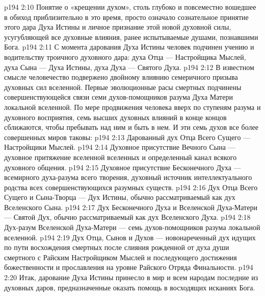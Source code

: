 \vs p194 2:10 \pc Понятие о «крещении духом», столь глубоко и повсеместно вошедшее в обиход приблизительно в это время, просто означало сознательное принятие этого дара Духа Истины и личное признание этой новой духовной силы, усугубляющей все духовные влияния, ранее испытываемые душами, познавшими Бога.
\vs p194 2:11 \pc С момента дарования Духа Истины человек подчинен учению и водительству троичного духовного дара: духа Отца --- Настройщика Мыслей, духа Сына --- Духа Истины, духа Духа --- Святого Духа.
\vs p194 2:12 В известном смысле человечество подвержено двойному влиянию семеричного призыва духовных сил вселенной. Первые эволюционные расы смертных подчинены совершенствующейся связи семи духов\hyp{}помощников разума Духа Матери локальной вселенной. По мере продвижения человека вверх по ступеням разума и духовного восприятия, семь высших духовных влияний в конце концов сближаются, чтобы пребывать над ним и быть в нем. И эти семь духов все более совершенных миров таковы:
\vs p194 2:13 \bibnobreakspace Дарованный дух Отца Всего Сущего --- Настройщики Мыслей.
\vs p194 2:14 \pc {}\bibnobreakspace Духовное присутствие Вечного Сына --- духовное притяжение вселенной вселенных и определенный канал всякого духовного общения.
\vs p194 2:15 \pc {}\bibnobreakspace Духовное присутствие Бесконечного Духа --- всемирного духа\hyp{}разума всего творения, духовный источник интеллектуального родства всех совершенствующихся разумных существ.
\vs p194 2:16 \pc {}\bibnobreakspace Дух Отца Всего Сущего и Сына\hyp{}Творца --- Дух Истины, обычно рассматриваемый как дух Вселенского Сына.
\vs p194 2:17 \pc {}\bibnobreakspace Дух Бесконечного Духа и Вселенской Духа\hyp{}Матери --- Святой Дух, обычно рассматриваемый как дух Вселенского Духа.
\vs p194 2:18 \pc {}\bibnobreakspace Дух\hyp{}разум Вселенской Духа\hyp{}Матери --- семь духов\hyp{}помощников разума локальной вселенной.
\vs p194 2:19 \pc {}\bibnobreakspace Дух Отца, Сынов и Духов --- новонареченный дух идущих по пути восхождения смертных после слияния рожденной от духа души смертного с Райским Настройщиком Мыслей и последующего достижения божественности и прославления на уровне Райского Отряда Финальности.
\vs p194 2:20 \pc Итак, дарование Духа Истины принесло в мир и всем народам последние из духовных даров, предназначенные оказать помощь в восходящих исканиях Бога.

